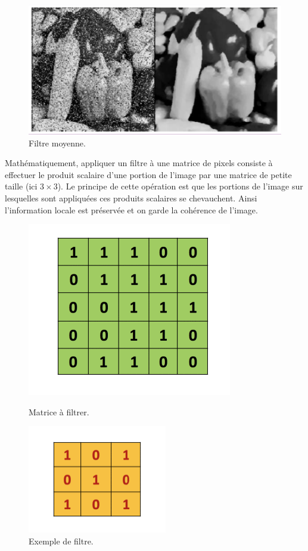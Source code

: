 \begin{figure}[h]
  \centering
  \includegraphics[scale=0.3]{assets/filtre-moyenne}
  \caption{Filtre moyenne.}
  \label{fig:filtre_moyenne}
\end{figure}

Mathématiquement, appliquer un filtre à une matrice de pixels consiste à effectuer le 
produit scalaire d'une portion de l'image par une matrice de petite taille (ici 
$3 \times 3$). Le principe de cette opération est que les portions de l'image sur 
lesquelles sont appliquées ces produits scalaires se chevauchent. Ainsi l'information 
locale est préservée et on garde la cohérence de l'image.

\begin{figure}[h]
  \centering
  \includegraphics[scale=0.5]{assets/matrice-pixels}
  \caption{Matrice à filtrer.}
  \includegraphics[scale=0.5]{assets/filtre}
  \caption{Exemple de filtre.}
  \label{fig:filtre}
\end{figure}

